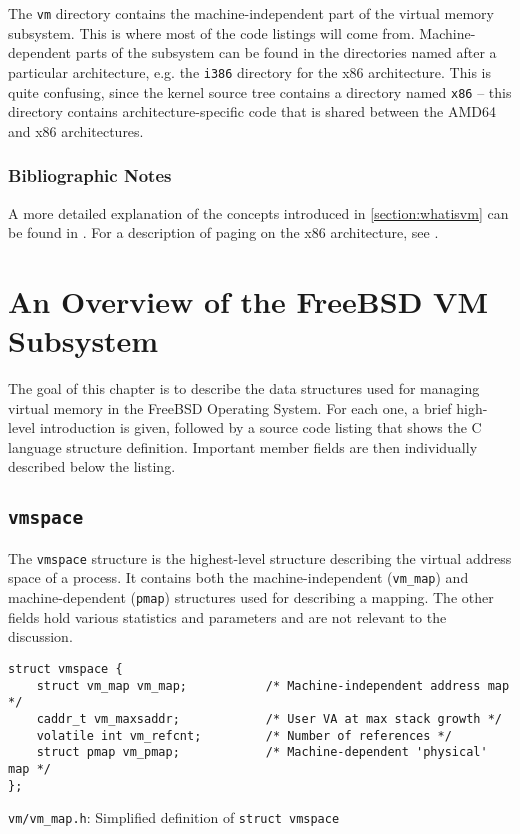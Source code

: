 \documentclass[shortabstract, english]{iithesis}
\begin{document}
The \texttt{vm} directory contains the machine-independent part of the virtual
memory subsystem. This is where most of the code listings will come from.
Machine-dependent parts of the subsystem can be found in the directories named
after a particular architecture, e.g. the \texttt{i386} directory for the x86
architecture. This is quite confusing, since the kernel source tree contains a
directory named \texttt{x86} -- this directory contains architecture-specific
code that is shared between the AMD64 and x86 architectures.

\subsection{Bibliographic Notes}
A more detailed explanation of the concepts introduced in \ref{section:whatisvm}
can be found in \cite[Section~3.3]{bib:tanenbaum}. For a description of paging
on the x86 architecture, see \cite[Chapter~4]{bib:intel}.

\chapter{An Overview of the FreeBSD VM Subsystem}

The goal of this chapter is to describe the data structures used for managing
virtual memory in the FreeBSD Operating System. For each one, a brief high-level
introduction is given, followed by a source code listing that shows the C
language structure definition. Important member fields are then individually
described below the listing.

\section{\texttt{vmspace}}

The \texttt{vmspace} structure is the highest-level structure describing
the virtual address space of a process. It contains both the machine-independent
(\texttt{vm_map}) and machine-dependent (\texttt{pmap}) structures
used for describing a mapping. The other fields hold various statistics and
parameters and are not relevant to the discussion.

\begin{listing}[H]
\begin{verbatim}
struct vmspace {
    struct vm_map vm_map;           /* Machine-independent address map */
    caddr_t vm_maxsaddr;            /* User VA at max stack growth */
    volatile int vm_refcnt;         /* Number of references */
    struct pmap vm_pmap;            /* Machine-dependent 'physical' map */
};
\end{verbatim}
\caption{\texttt{vm/vm\_map.h}: Simplified definition of \texttt{struct vmspace}}
\end{listing}
\end{document}
